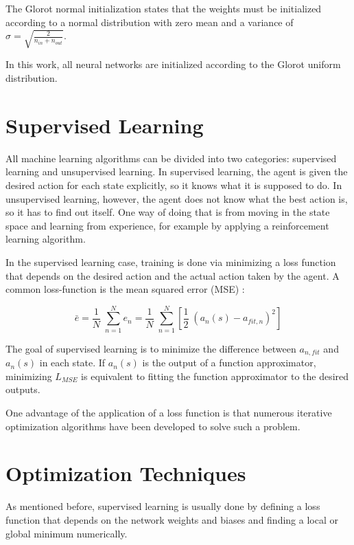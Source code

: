 The Glorot normal initialization states that the weights must be initialized according to a normal distribution with zero mean and a variance of $\sigma = \sqrt{\frac{2}{n_{in}+n_{out}}}$.

In this work, all neural networks are initialized according to the Glorot uniform distribution. 

\section{Supervised Learning}
All machine learning algorithms can be divided into two categories: supervised learning and unsupervised learning. In supervised learning, the agent is given the desired action for each state explicitly, so it knows what it is supposed to do. In unsupervised learning, however, the agent does not know what the best action is, so it has to find out itself. One way of doing that is from moving in the state space and learning from experience, for example by applying a reinforcement learning algorithm.

In the supervised learning case, training is done via minimizing a loss function that depends on the desired action and the actual action taken by the agent. A common loss-function is the mean squared error (MSE) :

\begin{equation}
\bar{e} = \frac{1}{N}\;\sum_{n=1}^{N}{e}_{n} =  \frac{1}{N}\;\sum_{n=1}^{N}[\frac{1}{2}\;(a_n(s)-a_{fit,n})^2]
\label{lossfun}
\end{equation}

The goal of supervised learning is to minimize the difference between $a_{n,fit}$ and $a_n(s)$ in each state. If $a_n(s)$ is the output of a function approximator, minimizing $L_{MSE}$ is equivalent to fitting the function approximator to the desired outputs.

One advantage of the application of a loss function is that numerous iterative optimization algorithms have been developed to solve such a problem.

\section{Optimization Techniques}

As mentioned before, supervised learning is usually done by defining a loss function that depends on the network weights and biases and finding a local or global minimum numerically.

